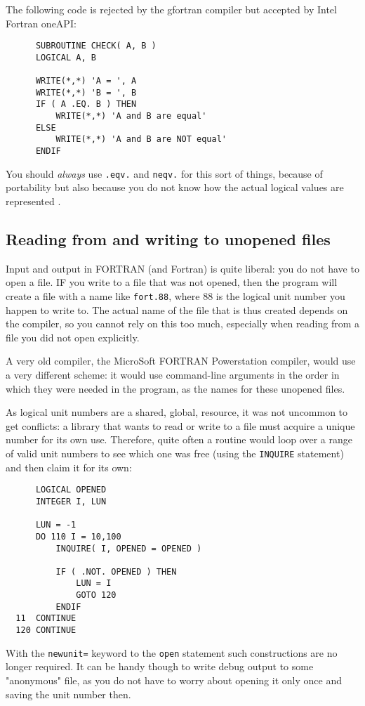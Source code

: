 The following code is rejected by the gfortran compiler but accepted by Intel Fortran oneAPI:
\begin{verbatim}
      SUBROUTINE CHECK( A, B )
      LOGICAL A, B

      WRITE(*,*) 'A = ', A
      WRITE(*,*) 'B = ', B
      IF ( A .EQ. B ) THEN
          WRITE(*,*) 'A and B are equal'
      ELSE
          WRITE(*,*) 'A and B are NOT equal'
      ENDIF
\end{verbatim}

You should \emph{always} use \verb+.eqv.+ and \verb+neqv.+ for this sort of things, because of
portability but also because you do not know how the actual logical values are represented \cite{DrFortranEquiv}.


\subsection{Reading from and writing to unopened files}
Input and output in FORTRAN (and Fortran) is quite liberal: you do not have to open a file. IF you write to
a file that was not opened, then the program will create a file with a name like \verb+fort.88+, where 88
is the logical unit number you happen to write to. The actual name of the file that is thus created
depends on the compiler, so you cannot rely on this too much, especially when reading from a file
you did not open explicitly.

A very old compiler, the MicroSoft FORTRAN Powerstation compiler, would use a very different scheme:
it would use command-line arguments in the order in which they were needed in the program, as the
names for these unopened files.

As logical unit numbers are a shared, global, resource, it was not uncommon to get conflicts: a library
that wants to read or write to a file must acquire a unique number for its own use. Therefore, quite
often a routine would loop over a range of valid unit numbers to see which one was free (using the \verb+INQUIRE+
statement) and then claim it for its own:
\begin{verbatim}
      LOGICAL OPENED
      INTEGER I, LUN

      LUN = -1
      DO 110 I = 10,100
          INQUIRE( I, OPENED = OPENED )

          IF ( .NOT. OPENED ) THEN
              LUN = I
              GOTO 120
          ENDIF
  11  CONTINUE
  120 CONTINUE
\end{verbatim}

With the \verb+newunit=+ keyword to the \verb+open+ statement such constructions are no longer required.
It can be handy though to write debug output to some "anonymous" file, as you do not have to worry
about opening it only once and saving the unit number then.
